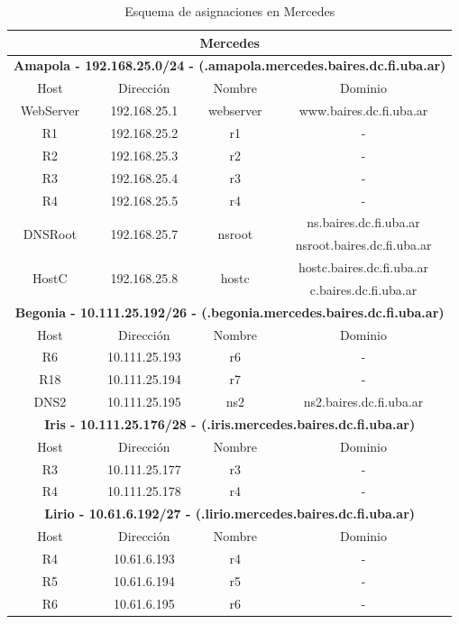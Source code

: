 \begin{table}[!htbp]
	\centering
	\begin{tabular}{|c|c|c|c|}   
		\hline
		\multicolumn{4}{|c|}{\textbf{Mercedes}} \\
		\hline
		\hline
		\multicolumn{4}{|c|}{\textbf{Amapola - 192.168.25.0/24 - (.amapola.mercedes.baires.dc.fi.uba.ar)}} \\
		\hline
		Host & Dirección & Nombre & Dominio \\
		\hline
		WebServer & 192.168.25.1 & webserver & www.baires.dc.fi.uba.ar \\
		\hline 
		R1 & 192.168.25.2 & r1 & - \\
		\hline
		R2 & 192.168.25.3 & r2 & - \\
 		\hline
		R3 & 192.168.25.4 & r3 & - \\
		\hline
		R4 & 192.168.25.5 & r4 & - \\
		\hline
		\multirow{2}{*}{DNSRoot} & \multirow{2}{*}{192.168.25.7} & \multirow{2}{*}{nsroot} & ns.baires.dc.fi.uba.ar \\
			& & & nsroot.baires.dc.fi.uba.ar \\
		\hline
		\multirow{2}{*}{HostC} & \multirow{2}{*}{192.168.25.8} & \multirow{2}{*}{hostc} & hostc.baires.dc.fi.uba.ar \\
			& & & c.baires.dc.fi.uba.ar \\
		\hline
		\hline
		\multicolumn{4}{|c|}{\textbf{Begonia - 10.111.25.192/26 - (.begonia.mercedes.baires.dc.fi.uba.ar)}} \\
		\hline
		Host & Dirección & Nombre & Dominio \\
		\hline
		R6 & 10.111.25.193 & r6 & - \\
		\hline
		R18 & 10.111.25.194 & r7 & - \\
		\hline
		DNS2 & 10.111.25.195 & ns2 & ns2.baires.dc.fi.uba.ar \\
		\hline
		\hline
		\multicolumn{4}{|c|}{\textbf{Iris - 10.111.25.176/28 - (.iris.mercedes.baires.dc.fi.uba.ar)}} \\
		\hline
		Host & Dirección & Nombre & Dominio \\
		\hline
		R3 & 10.111.25.177 & r3 & - \\
		\hline
		R4 & 10.111.25.178 & r4 & - \\
		\hline
		\hline
		\multicolumn{4}{|c|}{\textbf{Lirio - 10.61.6.192/27 - (.lirio.mercedes.baires.dc.fi.uba.ar)}} \\
		\hline
		Host & Dirección & Nombre & Dominio \\
		\hline
		R4 & 10.61.6.193 & r4 & - \\
		\hline
		R5 & 10.61.6.194 & r5 & - \\
		\hline
		R6 & 10.61.6.195 & r6 & - \\
		\hline
 	\end{tabular}
	\caption{Esquema de asignaciones en Mercedes}
\end{table}

